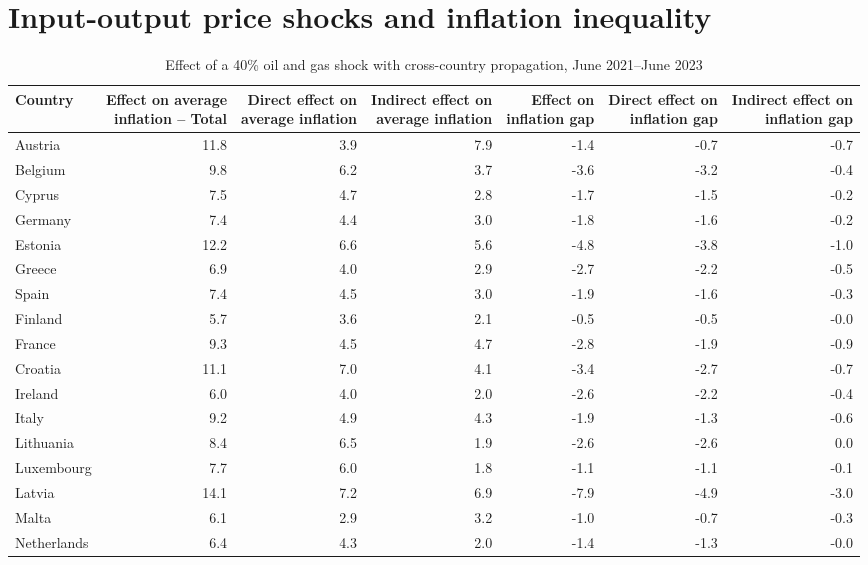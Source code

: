 \section*{Input-output price shocks and inflation inequality}
\begin{table}[H]
\centering
\caption{Effect of a 40\% oil and gas shock with cross-country propagation, June 2021--June 2023}
\label{tab:shock-oil-gas-chain-ea20}
\scriptsize
\setlength{\tabcolsep}{1.2pt}
\begin{tabular}{lrrrrrr}
\toprule
Country & \shortstack{Effect on average\\inflation -- Total} & \shortstack{Direct effect on\\average inflation} & \shortstack{Indirect effect on\\average inflation} & \shortstack{Effect on\\inflation gap} & \shortstack{Direct effect on\\inflation gap} & \shortstack{Indirect effect on\\inflation gap}
 \\
\midrule
Austria & 11.8 & 3.9 & 7.9 & -1.4 & -0.7 & -0.7
 \\
Belgium & 9.8 & 6.2 & 3.7 & -3.6 & -3.2 & -0.4
 \\
Cyprus & 7.5 & 4.7 & 2.8 & -1.7 & -1.5 & -0.2
 \\
Germany & 7.4 & 4.4 & 3.0 & -1.8 & -1.6 & -0.2
 \\
Estonia & 12.2 & 6.6 & 5.6 & -4.8 & -3.8 & -1.0
 \\
Greece & 6.9 & 4.0 & 2.9 & -2.7 & -2.2 & -0.5
 \\
Spain & 7.4 & 4.5 & 3.0 & -1.9 & -1.6 & -0.3
 \\
Finland & 5.7 & 3.6 & 2.1 & -0.5 & -0.5 & -0.0
 \\
France & 9.3 & 4.5 & 4.7 & -2.8 & -1.9 & -0.9
 \\
Croatia & 11.1 & 7.0 & 4.1 & -3.4 & -2.7 & -0.7
 \\
Ireland & 6.0 & 4.0 & 2.0 & -2.6 & -2.2 & -0.4
 \\
Italy & 9.2 & 4.9 & 4.3 & -1.9 & -1.3 & -0.6
 \\
Lithuania & 8.4 & 6.5 & 1.9 & -2.6 & -2.6 & 0.0
 \\
Luxembourg & 7.7 & 6.0 & 1.8 & -1.1 & -1.1 & -0.1
 \\
Latvia & 14.1 & 7.2 & 6.9 & -7.9 & -4.9 & -3.0
 \\
Malta & 6.1 & 2.9 & 3.2 & -1.0 & -0.7 & -0.3
 \\
Netherlands & 6.4 & 4.3 & 2.0 & -1.4 & -1.3 & -0.0

\end{tabular}
\end{table}
